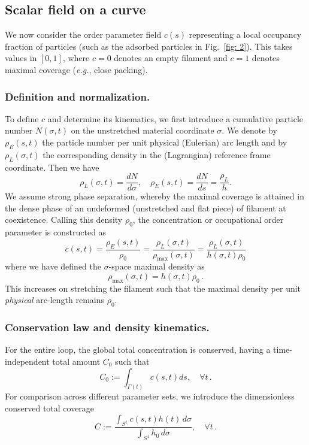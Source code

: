 \documentclass[
aip,
jcp,
reprint, 
floatfix
]{revtex4-1}
\begin{document}
\subsection{Scalar field on a curve}
\label{sec: fieldcurve}

We now consider the order parameter field $c(s)$ representing a local occupancy
fraction of particles (such as the adsorbed particles in Fig.~\ref{fig: 2}). This takes values in $[0,1]$, where $c=0$ denotes an empty filament and $c=1$ denotes
maximal coverage ({\em e.g.}, close packing).

\subsubsection{Definition and normalization.}
To define $c$ and determine its kinematics, we first introduce a cumulative particle number $N(\sigma, t)$ on the unstretched material coordinate $\sigma$. 
We denote by $\rho_E(s,t)$ the particle number per unit physical (Eulerian) arc length and by $\rho_L(\sigma,t)$ the corresponding density in the (Lagrangian) reference frame coordinate. Then we have
\begin{equation} \label{eq: rho_L}
    \rho_L(\sigma, t)=\frac{d N}{d \sigma}, \quad \rho_E(s, t)=\frac{d N}{d s}=\frac{\rho_L}{h} .
\end{equation}
We assume strong phase separation, whereby the maximal coverage is attained in the dense phase of an undeformed (unstretched and flat piece) of filament at coexistence. Calling this density $\rho_0$, the concentration or occupational order parameter is constructed as
\begin{equation}
    c(s,t)= \frac{\rho_E(s,t)}{\rho_0}  = \frac{\rho_L(\sigma,t)}{\rho_\text{max}(\sigma,t)} = \frac{\rho_L(\sigma,t)}{h(\sigma,t) \rho_0} 
    \label{eq:def_c}
\end{equation}
where we have defined the $\sigma$-space maximal density as 
\begin{equation}
    \rho_\text{max}(\sigma,t)=h(\sigma,t) \rho_0\,.
\end{equation}
This increases on stretching the filament such that the maximal density per unit \emph{physical} arc-length remains $\rho_0$. 


\subsubsection{Conservation law and density kinematics.}
For the entire loop, the global total concentration is conserved, having a time-independent total amount $C_0$ such that 
\begin{equation}
  C_0:=\int_{\Gamma(t)} c(s,t) d s, \quad \forall t \,.
\end{equation}
For comparison across different parameter sets, we introduce the dimensionless conserved total coverage
\begin{equation}\label{eq:c_total_nd}
C := \frac{\int_{S^1} c(s,t)h(t)\,d \sigma}{\int_{S^1} h_0\,d\sigma}, \quad \forall t \,.
\end{equation}
\end{document}
